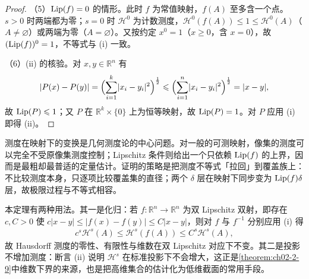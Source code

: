 \documentclass[../../main.tex]{subfiles}%
\begin{document}
\begin{proof}
（5）$\operatorname{Lip}(f)=0$ 的情形。此时 $f$ 为常值映射，$f(A)$ 至多含一个点。$s>0$ 时两端都为零；$s=0$ 时 $\mathcal{H}^0$ 为计数测度，$\mathcal{H}^0(f(A))\leqslant1\leqslant\mathcal{H}^0(A)$（$A\neq\varnothing$）或两端为零（$A=\varnothing$）。又按约定 $x^0=1$（$x\geqslant0$，含 $x=0$），故 $(\operatorname{Lip}(f))^0=1$，不等式与 (i) 一致。

（6）(ii) 的核验。对 $x,y\in\mathbb{R}^n$ 有
\begin{align*}
\lvert P(x)-P(y)\rvert=\Bigl(\sum_{i=1}^{k}\lvert x_i-y_i\rvert^2\Bigr)^{\frac12}\leqslant\Bigl(\sum_{i=1}^{n}\lvert x_i-y_i\rvert^2\Bigr)^{\frac12}=\lvert x-y\rvert ,
\end{align*}
故 $\operatorname{Lip}(P)\leqslant1$；又 $P$ 在 $\mathbb{R}^k\times\{0\}$ 上为恒等映射，故 $\operatorname{Lip}(P)=1$。对 $P$ 应用 (i) 即得 (ii)。
\end{proof}

\begin{remark}\label{remark:ch02-thm-2-8-动机}
测度在映射下的变换是几何测度论的中心问题。对一般的可测映射，像集的测度可以完全不受原像集测度控制；Lipschitz 条件则给出一个只依赖 $\operatorname{Lip}(f)$ 的上界，因而是最粗却最普适的定量估计。证明的策略是把测度不等式「拉回」到覆盖族上：不比较测度本身，只逐项比较覆盖集的直径；两个 $\delta$ 层在映射下同步变为 $\operatorname{Lip}(f)\delta$ 层，故极限过程与不等式相容。

本定理有两种用法。其一是化归：若 $f:\mathbb{R}^n\to\mathbb{R}^n$ 为双 Lipschitz 双射，即存在 $c,C>0$ 使 $c\lvert x-y\rvert\leqslant\lvert f(x)-f(y)\rvert\leqslant C\lvert x-y\rvert$，则对 $f$ 与 $f^{-1}$ 分别应用 (i) 得
\begin{align*}
c^{s}\mathcal{H}^s(A)\leqslant\mathcal{H}^s(f(A))\leqslant C^{s}\mathcal{H}^s(A),
\end{align*}
故 Hausdorff 测度的零性、有限性与维数在双 Lipschitz 对应下不变。其二是投影不增加测度：断言 (ii) 说明 $\mathcal{H}^s$ 在标准投影下不会增大，这正是\cref{theorem:ch02-2-9}中维数下界的来源，也是把高维集合的估计化为低维截面的常用手段。%
\end{remark}
\end{document}
